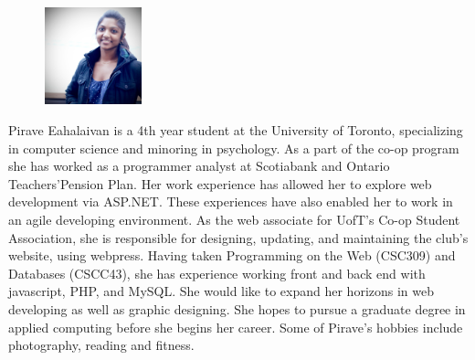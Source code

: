 \documentclass[pdftex,10pt,a4paper]{report}
\begin{document}
\begin{figure}
  \vspace{-20pt}
  \begin{center}
    \includegraphics[width=0.25\textwidth]{img/group/pi}
  \end{center}
  \vspace{-20pt}
  \end{figure}
Pirave Eahalaivan is a 4th year student at the University of Toronto, specializing in computer science and minoring in psychology. As a part of the co-op program she has worked as a programmer analyst at Scotiabank and Ontario Teachers'Pension Plan. Her work experience has allowed her to explore web development via ASP.NET. These experiences have also enabled her to work in an agile developing environment. As the web associate for UofT's Co-op Student Association, she is responsible for designing, updating, and maintaining the club's website, using webpress. Having taken Programming on the Web (CSC309) and Databases (CSCC43), she has experience working front and back end with javascript, PHP, and MySQL. She would like to expand her horizons in web developing as well as graphic designing. She hopes to pursue a graduate degree in applied computing before she begins her career. Some of Pirave's hobbies include photography, reading and fitness.\\
\end{document}
